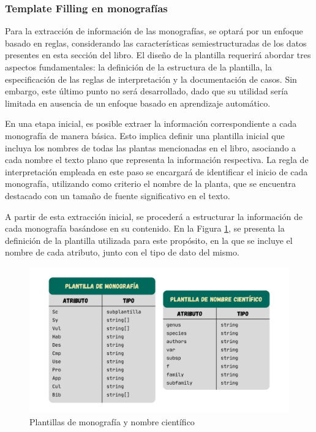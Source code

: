\subsubsection{Template Filling en monografías}
Para la extracción de información de las monografías, se optará por un enfoque basado en reglas, 
considerando las características semiestructuradas de los datos presentes en esta sección del libro. 
El diseño de la plantilla requerirá abordar tres aspectos fundamentales: la definición 
de la estructura de la plantilla, la especificación de las reglas de interpretación 
y la documentación de casos. Sin embargo, este último punto no será desarrollado, 
dado que su utilidad sería limitada en ausencia de un enfoque basado en aprendizaje automático.

En una etapa inicial, es posible extraer la información correspondiente a cada monografía 
de manera básica. Esto implica definir una plantilla inicial que incluya los nombres de 
todas las plantas mencionadas en el libro, asociando a cada nombre el texto plano que 
representa la información respectiva. La regla de interpretación empleada en este paso se 
encargará de identificar el inicio de cada monografía, utilizando como criterio el nombre de 
la planta, que se encuentra destacado con un tamaño de fuente significativo en el texto.

A partir de esta extracción inicial, se procederá a estructurar la información de cada monografía 
basándose en su contenido. En la Figura \ref{fig:template-monograph}, se presenta la definición de la plantilla utilizada 
para este propósito, en la que se incluye el nombre de cada atributo, junto con el tipo de dato del mismo.

\begin{figure}[ht!]
    \centering
    \includegraphics[width=1\textwidth]{Images/monograph-template.png}
    \caption{Plantillas de monografía y nombre científico}
    \label{fig:template-monograph}
\end{figure}

